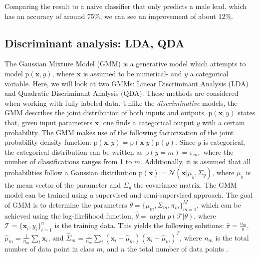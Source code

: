 \documentclass{article}
\begin{document}
Comparing the result to a naive classifier that only predicts a male lead, which has an accuracy of around 75\%, we can see an improvement of about 12\%.


\subsection{Discriminant analysis: LDA, QDA}
The Gaussian Mixture Model (GMM) is a generative model which attempts to model $\text{p}(\textbf{x}, y)$, where $\textbf{x}$ is assumed to be numerical- and $y$ a categorical variable. Here, we will look at two GMMs: Linear Discriminant Analysis (LDA) and Quadratic Discriminant Analysis (QDA). These methods are considered when working with fully labeled data. Unlike the \textit{discriminative} models, the GMM describes the joint distribution of both inputs and outputs. $\text{p}(\textbf{x},y)$ states that, given input parameters $\textbf{x}$, one finds a categorical output $y$ with a certain probability. The GMM makes use of the following factorization of the joint probability density function: $\text{p}(\textbf{x},y)=\text{p}(\textbf{x}|y)\text{p}(y)$. Since $y$ is categorical, the categorical distribution can be written as $\text{p}(y=m)=\pi_{m},$ where the number of classifications ranges from 1 to $m$. Additionally, it is assumed that all probabilities follow a Gaussian distribution $\text{p}(\textbf{x})=\mathcal{N}(\textbf{x}|\mu_{y},\Sigma_y)$, where $\mu_{y}$ is the mean vector of the parameter and $\Sigma_{y}$ the covariance matrix. The GMM model can be trained using a supervised and semi-supervised approach. The goal of GMM is to determine the parameters $\theta=\{\mu_m,\Sigma_m,\pi_m\}^{M}_{m=1}$, which can be achieved using the log-likelihood function, $\hat{\theta}=\mathop{\text{arg}\max_{\text{m}} \text{ln}}p(\mathcal{T}|\theta)$, where $\mathcal{T}=\{\textbf{x}_i,y_i\}^{n}_{i=1}$ is the training data. This yields the following solutions: $\hat{\pi}=\frac{n_m}{n}$,$\hat{\mu}_m=\frac{1}{n_m}\sum_{i}\textbf{x}_i$, and $\hat{\Sigma}_m=\frac{1}{n_m}\sum_i(\textbf{x}_i-\hat{\mu}_m)(\textbf{x}_i-\hat{\mu}_m)^T$, where $n_m$ is the total number of data point in class $m$, and $n$ the total number of data points \cite{smlbook}.
\end{document}
